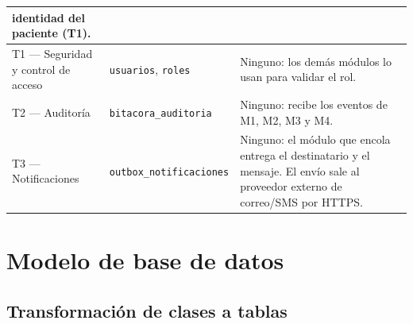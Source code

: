 \documentclass[11pt,a4paper]{article}
\begin{document}
\begin{xltabular}{\linewidth}{|P{2.9cm}|P{4.6cm}|L|}
    identidad del paciente (T1). \\ \hline
  T1 --- Seguridad y control de acceso &
    \texttt{usuarios}, \texttt{roles} &
    Ninguno: los demás módulos lo usan para validar el rol. \\ \hline
  T2 --- Auditoría &
    \texttt{bitacora\_auditoria} &
    Ninguno: recibe los eventos de M1, M2, M3 y M4. \\ \hline
  T3 --- Notificaciones &
    \texttt{outbox\_notificaciones} &
    Ninguno: el módulo que encola entrega el destinatario y el mensaje. El envío sale al
    proveedor externo de correo/SMS por HTTPS. \\ \hline
\end{xltabular}

\newpage
\section{Modelo de base de datos}\label{sec:modelo}

\subsection{Transformación de clases a tablas}
\end{document}
